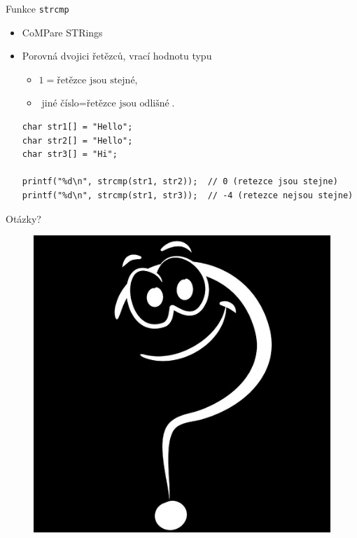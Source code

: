 \documentclass[14pt,aspectratio=169]{beamer}
\begin{document}
    \begin{frame}[t,fragile]{Funkce \texttt{strcmp}}
        \begin{itemize}
            \item CoMPare STRings
            \item Porovná dvojici řetězců, vrací hodnotu typu 
            \begin{itemize}
                \item $1=\text{řetězce jsou stejné}$,
                \item $\text{jiné číslo}=\text{řetězce jsou odlišné}$.
            \end{itemize}
            \begin{lstlisting}
char str1[] = "Hello";
char str2[] = "Hello";
char str3[] = "Hi";

printf("%d\n", strcmp(str1, str2));  // 0 (retezce jsou stejne)
printf("%d\n", strcmp(str1, str3));  // -4 (retezce nejsou stejne)
            \end{lstlisting}
        \end{itemize}
    \end{frame}

    \begin{frame}{Otázky?}
        \begin{figure}
            \centering
            \includegraphics[scale=.4]{images/discussion_inverted.png}
        \end{figure}
    \end{frame}
\end{document}
